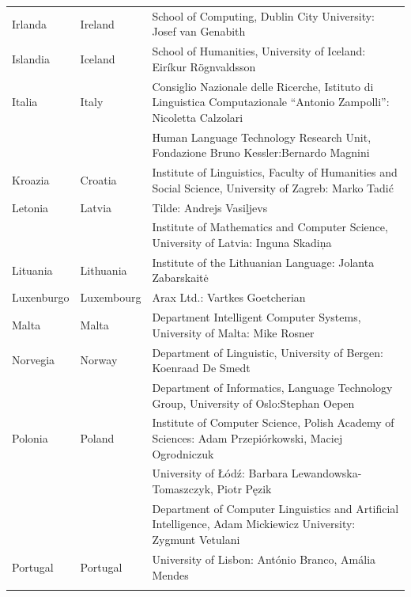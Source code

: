 \begin{longtable}{@{}llp{113mm}@{}}
  Irlanda & \textcolor{grey1}{Ireland} & School of Computing, Dublin City University: Josef van Genabith\\ \addlinespace
  Islandia & \textcolor{grey1}{Iceland} & School of Humanities, University of Iceland: Eiríkur Rögnvaldsson\\ \addlinespace
  Italia & \textcolor{grey1}{Italy} & Consiglio Nazionale delle Ricerche, Istituto di Linguistica Computazionale “Antonio Zampolli”: Nicoletta Calzolari\\ \addlinespace
  & & Human Language Technology Research Unit, Fondazione Bruno Kessler:\newline Bernardo Magnini\\ \addlinespace 
  Kroazia & \textcolor{grey1}{Croatia} & Institute of Linguistics, Faculty of Humanities and Social Science, University of Zagreb: Marko Tadić \\ \addlinespace
  Letonia & \textcolor{grey1}{Latvia} & Tilde: Andrejs Vasiļjevs\\ \addlinespace 
  & & Institute of Mathematics and Computer Science, University of Latvia: Inguna Skadiņa\\ \addlinespace
  Lituania & \textcolor{grey1}{Lithuania} & Institute of the Lithuanian Language: Jolanta Zabarskaitė\\ \addlinespace
  Luxenburgo & \textcolor{grey1}{Luxembourg} & Arax Ltd.: Vartkes Goetcherian\\ \addlinespace
  Malta & \textcolor{grey1}{Malta} & Department Intelligent Computer Systems, University of Malta: Mike Rosner\\ \addlinespace
  Norvegia & \textcolor{grey1}{Norway} & Department of Linguistic, University of Bergen: Koenraad De Smedt\\ \addlinespace 
  & & Department of Informatics, Language Technology Group, University of Oslo:\newline Stephan Oepen \\ \addlinespace
  Polonia & \textcolor{grey1}{Poland} & Institute of Computer Science, Polish Academy of Sciences: Adam Przepiórkowski, Maciej Ogrodniczuk \\ \addlinespace
  & & University of Łódź: Barbara Lewandowska-Tomaszczyk, Piotr Pęzik\\ \addlinespace
  & & Department of Computer Linguistics and Artificial Intelligence, Adam Mickiewicz University: Zygmunt Vetulani \\ \addlinespace
  Portugal & \textcolor{grey1}{Portugal} & University of Lisbon: António Branco, Amália Mendes \\ \addlinespace

\end{longtable}
